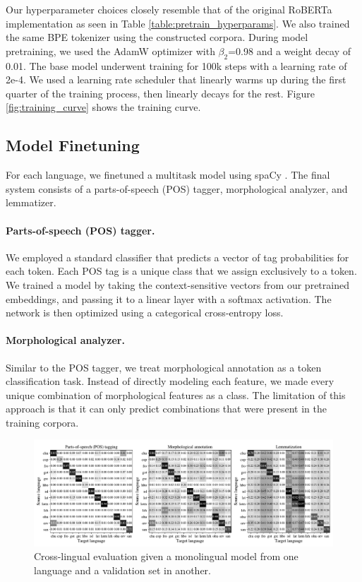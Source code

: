 \documentclass[11pt]{article}
\begin{document}


Our hyperparameter choices closely resemble that of the original RoBERTa implementation as seen in Table \ref{table:pretrain_hyperparams}.
We also trained the same BPE tokenizer \citep{sennrich-etal-2016-neural} using the constructed corpora.
During model pretraining, we used the AdamW optimizer with $\beta_2$=0.98 and a weight decay of 0.01.
The base model underwent training for 100k steps with a learning rate of 2e-4.
We used a learning rate scheduler that linearly warms up during the first quarter of the training process, then linearly decays for the rest.
Figure \ref{fig:training_curve} shows the training curve.

\subsection{Model Finetuning}

For each language, we finetuned a multitask model using spaCy \cite{honnibal-etal-2020-spacy}. 
The final system consists of a parts-of-speech (POS) tagger, morphological analyzer, and lemmatizer.

\paragraph{Parts-of-speech (POS) tagger.}
We employed a standard classifier that predicts a vector of tag probabilities for each token.
Each POS tag is a unique class that we assign exclusively to a token.
We trained a model by taking the context-sensitive vectors from our pretrained embeddings, and passing it to a linear layer with a softmax activation.
The network is then optimized using a categorical cross-entropy loss.

\paragraph{Morphological analyzer.}
Similar to the POS tagger, we treat morphological annotation as a token classification task.
Instead of directly modeling each feature, we made every unique combination of morphological features as a class.
The limitation of this approach is that it can only predict combinations that were present in the training corpora.

\begin{figure}[t]
\centering
\includegraphics[width=\textwidth]{figures/cross_lingual.pdf}
\caption{Cross-lingual evaluation given a monolingual model from one language and a validation set in another.}
\label{fig:cross_lingual}
\end{figure}
\end{document}
